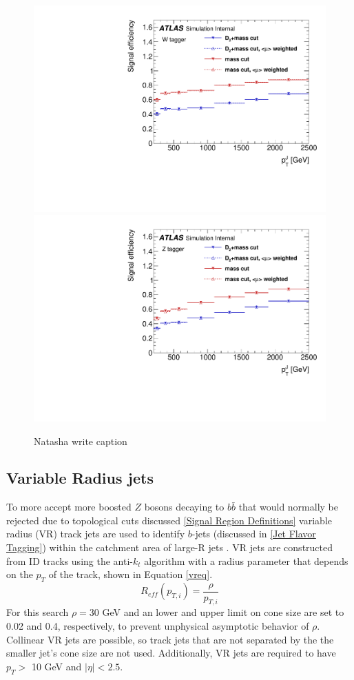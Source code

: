 \begin{figure}[h!]
  \centering
  \includegraphics[width=0.48\hsize]{figures/Analysis/sigeffW.pdf}
  \includegraphics[width=0.48\hsize]{figures/Analysis/sigeffZ.pdf}
  \caption{Natasha write caption} 
  \label{fig:boson_tagger_optimization}
\end{figure} 
\FloatBarrier

\subsection{Variable Radius jets}
To more accept more boosted $Z$ bosons decaying to $b\bar{b}$ that would normally be rejected due to topological cuts discussed \ref{Signal Region Definitions} variable radius (VR) track jets are used to identify $b$-jets (discussed in \ref{Jet Flavor Tagging}) within the catchment area of large-R jets \cite{vrjets}. VR jets are constructed from ID tracks using the anti-$k_{t}$ algorithm with a radius parameter that depends on the $p_{T}$ of the track, shown in Equation \ref{vreq}.
\begin{equation}
R_{eff}(p_{T, i}) = \frac{\rho}{p_{T,i}}
\label{vreq}
\end{equation}
For this search $\rho=30$ GeV and an lower and upper limit on cone size are set to 0.02 and 0.4, respectively, to prevent unphysical asymptotic behavior of $\rho$. Collinear VR jets are possible, so track jets that are not separated by the the smaller jet's cone size are not used. Additionally, VR jets are required to have $p_{T} > $ 10 GeV and $|\eta| < 2.5$. 

